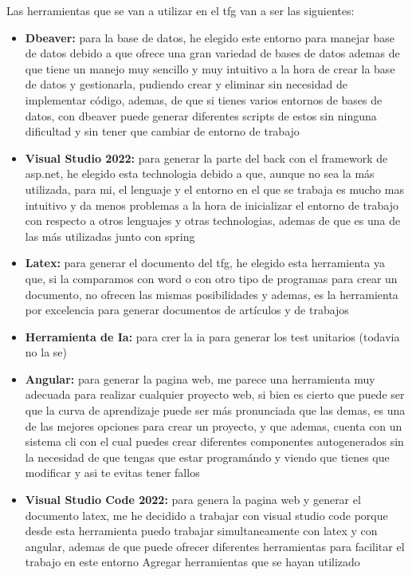 Las herramientas que se van a utilizar en el tfg van a ser las siguientes:
    \begin{itemize}
        \item \textbf{Dbeaver:} para la base de datos, he elegido este entorno para manejar base de datos debido a que ofrece una gran variedad de bases de datos ademas de que tiene un manejo muy sencillo y muy intuitivo a la hora de crear la base de datos y gestionarla, pudiendo crear y eliminar sin necesidad de implementar código, ademas, de que si tienes varios entornos de bases de datos, con dbeaver puede generar diferentes scripts de estos sin ninguna dificultad y sin tener que cambiar de entorno de trabajo
        \item \textbf{Visual Studio 2022:} para generar la parte del back con el framework de asp.net, he elegido esta technologia debido a que, aunque no sea la más utilizada, para mi, el lenguaje y el entorno en el que se trabaja es mucho mas intuitivo y da menos problemas a la hora de inicializar el entorno de trabajo con respecto a otros lenguajes y otras technologias, ademas de que es una de las más utilizadas junto con spring
        \item \textbf{Latex:} para generar el documento del tfg, he elegido esta herramienta ya que, si la comparamos con word o con otro tipo de programas para crear un documento, no ofrecen las mismas posibilidades y ademas, es la herramienta por excelencia para generar documentos de artículos y de trabajos
        \item \textbf{Herramienta de Ia:} para crer la ia para generar los test unitarios (todavia no la se)
        \item \textbf{Angular:} para generar la pagina web, me parece una herramienta muy adecuada para realizar cualquier proyecto web, si bien es cierto que puede ser que la curva de aprendizaje puede ser más pronunciada que las demas, es una de las mejores opciones para crear un proyecto, y que ademas, cuenta con un sistema cli con el cual puedes crear diferentes componentes autogenerados sin la necesidad de que tengas que estar programándo y viendo que tienes que modificar y asi te evitas tener fallos 
        \item \textbf{Visual Studio Code 2022:} para genera la pagina web y generar el documento latex, me he decidido a trabajar con visual studio code porque desde esta herramienta puedo trabajar simultaneamente con latex y con angular, ademas de que puede ofrecer diferentes herramientas para facilitar el trabajo en este entorno {Agregar herramientas que se hayan utilizado}
    \end{itemize}




